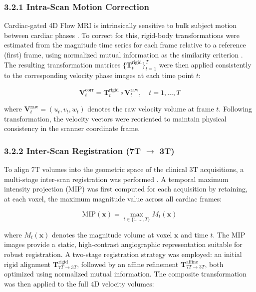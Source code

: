 \subsubsection*{3.2.1 Intra-Scan Motion Correction}

Cardiac-gated 4D Flow MRI is intrinsically sensitive to bulk subject motion between cardiac phases \cite{stehning2020}. To correct for this, rigid-body transformations were estimated from the magnitude time series for each frame relative to a reference (first) frame, using normalized mutual information as the similarity criterion \cite{maes1997}. The resulting transformation matrices $\{\mathbf{T}_t^{\text{rigid}}\}_{t=1}^{T}$ were then applied consistently to the corresponding velocity phase images at each time point $t$:

\begin{equation}
    \mathbf{V}_t^{\text{corr}} = \mathbf{T}_t^{\text{rigid}} \circ \mathbf{V}_t^{\text{raw}}, \quad t = 1, \ldots, T
\end{equation}

where $\mathbf{V}_t^{\text{raw}} = (u_t, v_t, w_t)$ denotes the raw velocity volume at frame $t$. Following transformation, the velocity vectors were reoriented to maintain physical consistency in the scanner coordinate frame.

\subsubsection*{3.2.2 Inter-Scan Registration (7T $\rightarrow$ 3T)}

To align 7T volumes into the geometric space of the clinical 3T acquisitions, a multi-stage inter-scan registration was performed \cite{qu2020synth7t,cui2024synth7t}. A temporal maximum intensity projection (MIP) was first computed for each acquisition by retaining, at each voxel, the maximum magnitude value across all cardiac frames:

\begin{equation}
    \text{MIP}(\mathbf{x}) = \max_{t \in \{1,\ldots,T\}} M_t(\mathbf{x})
\end{equation}

where $M_t(\mathbf{x})$ denotes the magnitude volume at voxel $\mathbf{x}$ and time $t$. The MIP images provide a static, high-contrast angiographic representation suitable for robust registration. A two-stage registration strategy was employed: an initial rigid alignment $\mathbf{T}^{\text{rigid}}_{7T \to 3T}$, followed by an affine refinement $\mathbf{T}^{\text{affine}}_{7T \to 3T}$, both optimized using normalized mutual information. The composite transformation was then applied to the full 4D velocity volumes:

